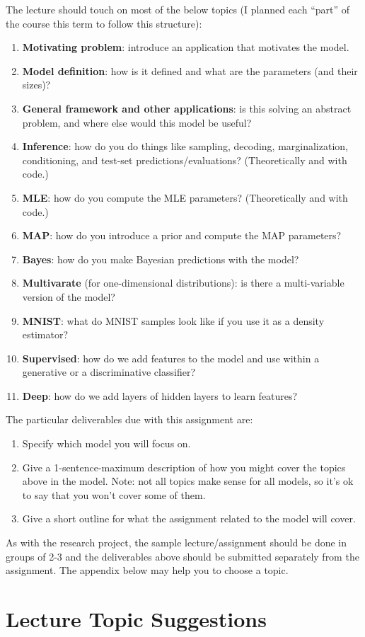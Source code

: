 \documentclass{article}
\def\blu#1{{\color{blu}#1}}
\def\enum#1{\begin{enumerate}#1\end{enumerate}}
\begin{document}
The lecture should touch on most of the below topics (I planned each ``part'' of the course this term to follow this structure):
\enum{
\item \textbf{Motivating problem}: introduce an application that motivates the model.
\item  \textbf{Model definition}: how is it defined and what are the parameters (and their sizes)?
\item  \textbf{General framework and other applications}: is this solving an abstract problem, and where else would this model be useful?
\item  \textbf{Inference}: how do you do things like sampling, decoding, marginalization, conditioning, and test-set predictions/evaluations? (Theoretically and with code.)
\item  \textbf{MLE}: how do you compute the MLE parameters? (Theoretically and with code.)
\item  \textbf{MAP}: how do you introduce a prior and compute the MAP parameters?
\item  \textbf{Bayes}: how do you make Bayesian predictions with the model?
\item  \textbf{Multivarate} (for one-dimensional distributions): is there a multi-variable version of the model?
\item  \textbf{MNIST}: what do MNIST samples look like if you use it as a density estimator?
\item  \textbf{Supervised}: how do we add features to the model and use within a generative or a discriminative classifier?
\item  \textbf{Deep}: how do we add layers of hidden layers to learn features?
}
The particular deliverables due with this assignment are:
\enum{
\item \blu{Specify which model you will focus on.}
\item \blu{Give a 1-sentence-maximum description of how you might cover the topics above in the model.} Note: not all topics make sense for all models, so it's ok to say that you won't cover some of them.
\item \blu{Give a short outline for what the assignment related to the model will cover.}
}
As with the research project, \blu{the sample lecture/assignment should be done in groups of 2-3} and the \blu{deliverables above should be submitted separately from the assignment}. The appendix below may help you to choose a topic.

\appendix

\section{Lecture Topic Suggestions}
\end{document}

